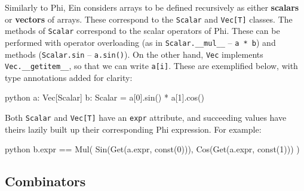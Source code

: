Similarly to Phi, Ein considers arrays to be defined recursively as either \textbf{scalars} or \textbf{vectors} of arrays. These correspond to the \texttt{Scalar} and \texttt{Vec[T]} classes. The methods of \texttt{Scalar} correspond to the scalar operators of Phi. These can be performed with operator overloading (as in \texttt{Scalar.\_\_mul\_\_} -- \texttt{a * b}) and methods (\texttt{Scalar.sin} -- \texttt{a.sin()}). On the other hand, \texttt{Vec} implements \texttt{Vec.\_\_getitem\_\_}, so that we can write \texttt{a[i]}. These are exemplified below, with type annotations added for clarity:
\begin{center}
\begin{cminted}{python}
a: Vec[Scalar]
b: Scalar = a[0].sin() * a[1].cos()
\end{cminted}
\end{center}
Both \texttt{Scalar} and \texttt{Vec[T]} have an \texttt{expr} attribute, and succeeding values have theirs lazily built up their corresponding Phi expression. For example: 
\begin{center}
\begin{cminted}{python}
b.expr == Mul(
    Sin(Get(a.expr, const(0))), 
    Cos(Get(a.expr, const(1)))
)
\end{cminted}
\end{center}

\subsection{Combinators}

